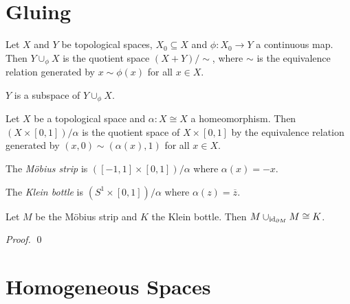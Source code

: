 \section{Gluing}

\begin{df}[Gluing]
Let $X$ and $Y$ be topological spaces, $X_0 \subseteq X$ and $\phi : X_0 \rightarrow Y$ a continuous map. Then $Y \cup_\phi X$ is the quotient space $(X + Y)/ \sim$, where $\sim$ is the equivalence relation generated by $x \sim \phi(x)$ for all $x \in X$.
\end{df}

\begin{prop}
$Y$ is a subspace of $Y \cup_\phi X$.
\end{prop}

\begin{df}
Let $X$ be a topological space and $\alpha : X \cong X$ a homeomorphism. Then $(X \times [0,1]) / \alpha$ is the quotient space of $X \times [0,1]$ by the equivalence relation generated by $(x,0) \sim (\alpha(x),1)$ for all $x \in X$.
\end{df}

\begin{df}
The \emph{M\"{o}bius strip} is $([-1,1] \times [0,1])/ \alpha$ where $\alpha(x) = -x$.
\end{df}

\begin{df}
The \emph{Klein bottle} is $(S^1 \times [0,1]) / \alpha$ where $\alpha(z) = \overline{z}$.
\end{df}

\begin{prop}
Let $M$ be the M\"{o}bius strip and $K$ the Klein bottle. Then $M \cup_{\mathrm{id}_{\partial M}} M \cong K$.
\end{prop}

\begin{proof}
\pf
{}
\qed
\end{proof}

\section{Homogeneous Spaces}

